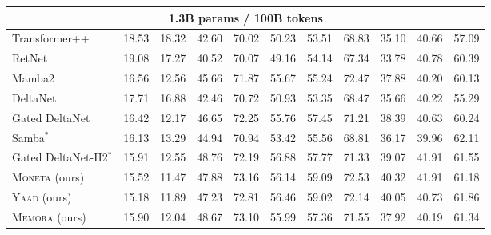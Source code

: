 \documentclass{article}
\newcommand{\ymodel}[0]{\textsc{Yaad}}
\newcommand{\mmodel}[0]{\textsc{Moneta}}
\newcommand{\xmodel}[0]{\textsc{Memora}}
\theoremstyle{plain}
\theoremstyle{definition}
\theoremstyle{remark}
\begin{document}
\begin{table}[t!]
{\begin{tabular}{l|c c|c c c c c c c c }
\midrule
\multicolumn{11}{c}{1.3B params / 100B tokens} \\
\midrule
 Transformer++ & 18.53 & 18.32 & 42.60 & 70.02 & 50.23 &	53.51 & 68.83	& 35.10 &  40.66  & 57.09  \\
 RetNet & 19.08 & 17.27 & 40.52 & 70.07 & 49.16 &	54.14 & 67.34	& 33.78 &  {40.78}  & {60.39} \\
 Mamba2 & {16.56} & {12.56} & {45.66} & {71.87} & {55.67} &	{55.24} & {72.47}	& {37.88} &  40.20  & 60.13   \\
 DeltaNet & 17.71 & 16.88 & 42.46 & 70.72 & 50.93 &	53.35 & 68.47	& 35.66 &  40.22  & 55.29   \\
 Gated DeltaNet & {16.42} & {12.17} & {46.65} & {72.25} & {55.76} &{57.45} & {71.21}	& {38.39} &  {40.63}  & 60.24  \\
 Samba$^*$ & 16.13 & 13.29 & 44.94 & 70.94 & 53.42 &	55.56 & 68.81	& 36.17 &  39.96  & \cellcolor{myblue} {62.11}   \\
  Gated DeltaNet-H2$^*$ & {15.91} &{12.55} & \cellcolor{myblue} {48.76} & {72.19} & \cellcolor{myblue} {56.88} &	{57.77} & {71.33}	 &{39.07} &  {41.91}  & 61.55     \\
  \midrule
\mmodel{} (ours) & 15.52 & \cellcolor{myblue} 11.47  & 47.88   &  \cellcolor{myblue} 73.16 & 56.14 & \cellcolor{myblue} 59.09  & \cellcolor{myblue} 72.53  & \cellcolor{myblue} 40.32 & \cellcolor{myblue} 41.91 & 61.18  \\
\ymodel{} (ours) &  \cellcolor{myblue} 15.18 & 11.89 & 47.23   &  72.81  &  56.46  & 59.02  & 72.14 & 40.05 &  40.73 &  61.86\\
\xmodel{} (ours) &  15.90 & 12.04  &  48.67   &  73.10 &  55.99 &  57.36 & 71.55  & 37.92 & 40.19 & 61.34 \\
\bottomrule
\end{tabular}
}
\end{table}
























\end{document}

